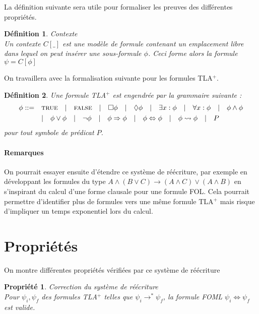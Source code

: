\documentclass[12pt]{article}
\newcommand{\TRUE}{\textsc{true}}
\newcommand{\FALSE}{\textsc{false}}
\newtheorem{prop}{Propriété}
\newtheorem{defin}{Définition}
\begin{document}
La définition suivante sera utile pour formaliser les preuves des différentes propriétés.

\begin{defin} \emph{Contexte} \\
  Un contexte \( C[\_] \) est une modèle de formule contenant un emplacement libre dans lequel on peut insérer une sous-formule \( \phi \).
  Ceci forme alors la formule \( \psi = C[\phi] \)
\end{defin}

On travaillera avec la formalisation suivante pour les formules TLA$^+$.

\begin{defin}
  Une formule TLA$^+$ est engendrée par la grammaire suivante :
  \begin{align*}\phi ::= & \quad
    \TRUE \quad | \quad
    \FALSE \quad | \quad
    \Box \phi \quad | \quad
    \Diamond \phi \quad | \quad
    \exists x : \phi \quad | \quad
    \forall x : \phi \quad | \quad
                           \phi \land \phi \\
                         & \quad | \quad
    \phi \lor \phi \quad | \quad
    \neg \phi \quad | \quad
    \phi \Rightarrow \phi \quad | \quad
    \phi \Leftrightarrow \phi \quad | \quad
    \phi \leadsto \phi \quad | \quad
      P
  \end{align*}
  pour tout symbole de prédicat $P$.
\end{defin}

\paragraph{Remarques}

On pourrait essayer ensuite d'étendre ce système de réécriture, par exemple en développant les formules du type $A \land (B \lor C) \longrightarrow (A \land C) \lor (A \land B)$ en s'inspirant du calcul d'une forme clausale pour une formule FOL.
Cela pourrait permettre d'identifier plus de formules vers une même formule TLA$^+$ mais risque d'impliquer un temps exponentiel lors du calcul.


\section{Propriétés}

On montre différentes propriétés vérifiées par ce système de réécriture

\begin{prop} \emph{Correction du système de réécriture} \\
  Pour $\psi_i, \psi_f$ des formules TLA$^+$ telles que $\psi_i \longrightarrow^* \psi_f$,
  la formule FOML $\psi_i \Leftrightarrow \psi_f$ est valide.
\end{prop}
\end{document}
